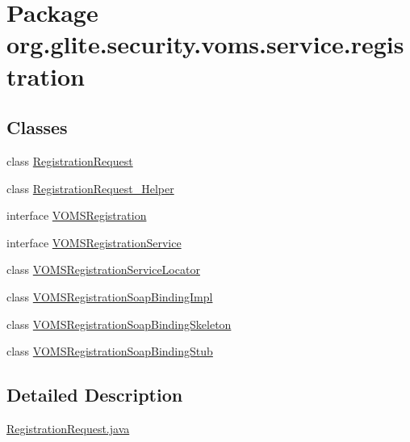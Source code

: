 \hypertarget{namespaceorg_1_1glite_1_1security_1_1voms_1_1service_1_1registration}{
\section{Package org.glite.security.voms.service.registration}
\label{namespaceorg_1_1glite_1_1security_1_1voms_1_1service_1_1registration}
}
\subsection*{Classes}
\begin{DoxyCompactItemize}
\item 
class \hyperlink{classorg_1_1glite_1_1security_1_1voms_1_1service_1_1registration_1_1RegistrationRequest}{RegistrationRequest}
\item 
class \hyperlink{classorg_1_1glite_1_1security_1_1voms_1_1service_1_1registration_1_1RegistrationRequest__Helper}{RegistrationRequest\_\-Helper}
\item 
interface \hyperlink{interfaceorg_1_1glite_1_1security_1_1voms_1_1service_1_1registration_1_1VOMSRegistration}{VOMSRegistration}
\item 
interface \hyperlink{interfaceorg_1_1glite_1_1security_1_1voms_1_1service_1_1registration_1_1VOMSRegistrationService}{VOMSRegistrationService}
\item 
class \hyperlink{classorg_1_1glite_1_1security_1_1voms_1_1service_1_1registration_1_1VOMSRegistrationServiceLocator}{VOMSRegistrationServiceLocator}
\item 
class \hyperlink{classorg_1_1glite_1_1security_1_1voms_1_1service_1_1registration_1_1VOMSRegistrationSoapBindingImpl}{VOMSRegistrationSoapBindingImpl}
\item 
class \hyperlink{classorg_1_1glite_1_1security_1_1voms_1_1service_1_1registration_1_1VOMSRegistrationSoapBindingSkeleton}{VOMSRegistrationSoapBindingSkeleton}
\item 
class \hyperlink{classorg_1_1glite_1_1security_1_1voms_1_1service_1_1registration_1_1VOMSRegistrationSoapBindingStub}{VOMSRegistrationSoapBindingStub}
\end{DoxyCompactItemize}


\subsection{Detailed Description}
\hyperlink{RegistrationRequest_8java}{RegistrationRequest.java}


